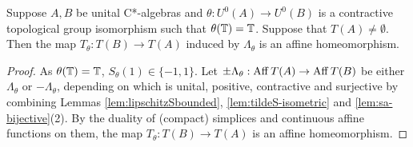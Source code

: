 \documentclass[12pt]{amsart}
\begin{document}
\begin{theorem}\label{thm:trace-result}
Suppose $A,B$ be unital C*-algebras and $\theta: U^0(A) \to U^0(B)$ is a contractive topological group isomorphism such that $\theta(\mathbb{T}) = \mathbb{T}$. Suppose that $T(A) \neq \emptyset$. Then the map $T_\theta: T(B) \to T(A)$ induced by $\Lambda_\theta$ is an affine homeomorphism.
\begin{proof}
As $\theta(\mathbb{T}) = \mathbb{T}$, $S_\theta(1) \in \{-1,1\}$. Let $\pm \Lambda_\theta: \operatorname{Aff} T(A) \to \operatorname{Aff} T(B)$ be either $\Lambda_\theta$ or $-\Lambda_\theta$, depending on which is unital, positive, contractive and surjective by combining Lemmas \ref{lem:lipschitzSbounded}, \ref{lem:tildeS-isometric} and \ref{lem:sa-bijective}(2). By the duality of (compact) simplices and continuous affine functions on them, the map $T_\theta: T(B) \to T(A)$ is an affine homeomorphism.
\end{proof}
\end{theorem}
\end{document}
